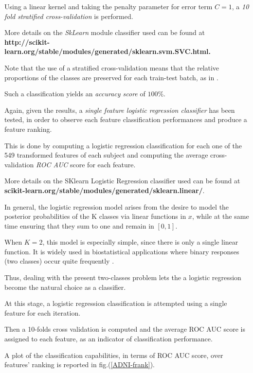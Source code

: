 \documentclass[12pt,openright,twoside,a4paper]{book}
\begin{document}
Using a linear kernel and taking the penalty parameter for error term $C=1$, a \textit{10 fold stratified cross-validation} is performed.

More details on the \textit{SkLearn} module classifier used can be found at \textbf{http://scikit-learn.org/stable/modules/generated/sklearn.svm.SVC.html.}
\vspace{1mm}

Note that the use of  a stratified cross-validation means that the relative proportions of the classes are preserved for each train-test batch, as in \cite{ESL}.

Such a classification yields  an\textit{ accuracy score} of $100\%$.
\vspace{5mm}

Again, given the results, a \textit{single feature logistic regression classifier} has been tested, in order to observe each feature classification performances and produce a feature ranking.

This is done by computing a logistic regression classification for each one of the 549 transformed features of each subject and computing the average cross-validation \textit{ROC AUC} score for each feature.

More details on the SKlearn Logistic Regression classifier used can be found at \textbf{scikit-learn.org/stable/modules/generated/sklearn.linear/}.
\vspace{5mm}

In general, the logistic regression model arises from the desire to model the posterior probabilities of the K classes via linear functions in $x$, while at the same time ensuring that they sum to one and remain in $[0,1]$.

When $K = 2$, this model is especially simple, since there is only a single linear function. It is widely used in biostatistical applications where binary responses (two classes) occur quite frequently \cite{ESL}.

Thus, dealing with the present two-classes problem lets the a logistic regression become the natural choice as a classifier.
\vspace{5mm}

At this stage, a logistic regression classification is attempted using a single feature for each iteration.

Then a 10-folds cross validation is computed and the average ROC AUC score is assigned to each feature, as an indicator of classification performance.

A plot of the  classification capabilities, in terms of ROC AUC score, over features' ranking is reported in fig.(\ref{ADNI-frank}). 
\end{document}

